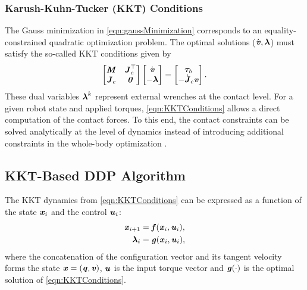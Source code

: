 \subsubsection{Karush-Kuhn-Tucker (KKT) Conditions}
The Gauss minimization in \cref{eqn:gaussMinimization} corresponds to an 
equality-constrained quadratic optimization problem. The optimal solutions ($\dot{\bm{\mathit{v}}},\bm{\mathit{\lambda}}$) must satisfy the so-called \gls{KKT} conditions given by
\begin{equation}\label{eqn:KKTConditions}
\left[\begin{matrix}\bm{\mathit{M}} & \bm{\mathit{J}}^{\top}_c \\{\bm{\mathit{J}}_{c}} & \bm{\mathit{0}}\end{matrix}\right] \left[\begin{matrix} \dot{\bm{\mathit{v}}} \\ -\boldsymbol{\lambda} \end{matrix}\right] = \left[\begin{matrix} \boldsymbol{\tau}_b \\ -\dot{\bm{\mathit{J}}}_c \bm{\mathit{v}}\end{matrix}\right].
\end{equation}
These dual variables $\bm{\mathit{\lambda}}^k$ represent external wrenches at the contact level. For a given robot state and applied torques, \cref{eqn:KKTConditions} allows a direct computation of the contact forces. To this end, the contact constraints can be solved analytically at the level of dynamics instead of introducing additional constraints in the whole-body optimization \cite{saab2013dynamic}.  

\subsection{KKT-Based DDP Algorithm}
The \gls{KKT} dynamics from \cref{eqn:KKTConditions} can be expressed as a function of the state $\bm{\mathit{x}}_i$ and the control $\bm{\mathit{u}}_i$:
\begin{align}\label{eqn:KKTFunctions}
\begin{split}
\bm{\mathit{x}}_{i+1}&=\bm{\mathit{f}}(\bm{\mathit{x}}_i,\bm{\mathit{u}}_i),\\
\bm{\mathit{\lambda}}_i&=\bm{\mathit{g}}(\bm{\mathit{x}}_i,\bm{\mathit{u}}_i),
\end{split}
\end{align}
where the concatenation of the configuration vector and its tangent velocity forms the state $\bm{\mathit{x}}=(\bm{\mathit{q}},\bm{\mathit{v}})$, $\bm{\mathit{u}}$ is the input torque vector and $\bm{\mathit{g}}(\cdot)$ is the optimal solution of \cref{eqn:KKTConditions}.

